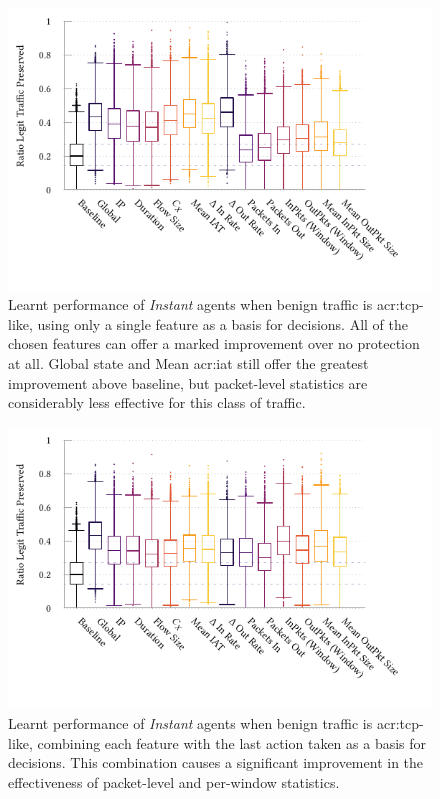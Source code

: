 \begin{figure}
	\centering
	\includegraphics[width=\linewidth]{plots/marl/ftprep-tcp-cap-box-thesis}
	\caption[Learnt performance of \emph{Instant} agents when benign traffic is TCP-like, using only a single feature as a basis for decisions.]{
		Learnt performance of \emph{Instant} agents when benign traffic is \gls{acr:tcp}-like, using only a single feature as a basis for decisions.
		All of the chosen features can offer a marked improvement over no protection at all.
		Global state and Mean \gls{acr:iat} still offer the greatest improvement above baseline, but packet-level statistics are considerably less effective for this class of traffic.
		\label{fig:tcp-cap-feature-plots}
	}
\end{figure}

\begin{figure}
	\centering
	\includegraphics[width=\linewidth]{plots/marl/ftprep-tcp-laf-cap-box-thesis}
	\caption[Learnt performance of \emph{Instant} agents when benign traffic is TCP-like, jointly tiling each feature with the last action taken.]{
		Learnt performance of \emph{Instant} agents when benign traffic is \gls{acr:tcp}-like, combining each feature with the last action taken as a basis for decisions.
		This combination causes a significant improvement in the effectiveness of packet-level and per-window statistics.
		\label{fig:tcp-laf-feature-plots}
	}
\end{figure}


